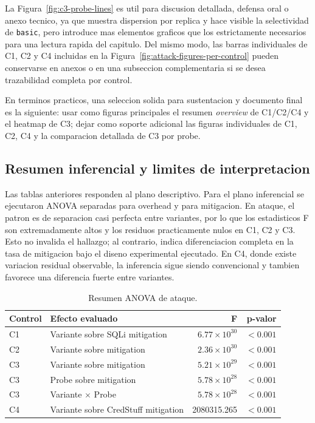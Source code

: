 La Figura~\ref{fig:c3-probe-lines} es util para discusion detallada, defensa oral o anexo tecnico, ya que muestra dispersion por replica y hace visible la selectividad de \texttt{basic}, pero introduce mas elementos graficos que los estrictamente necesarios para una lectura rapida del capitulo. Del mismo modo, las barras individuales de C1, C2 y C4 incluidas en la Figura~\ref{fig:attack-figures-per-control} pueden conservarse en anexos o en una subseccion complementaria si se desea trazabilidad completa por control.

En terminos practicos, una seleccion solida para sustentacion y documento final es la siguiente: usar como figuras principales el resumen \textit{overview} de C1/C2/C4 y el heatmap de C3; dejar como soporte adicional las figuras individuales de C1, C2, C4 y la comparacion detallada de C3 por probe.

\subsection{Resumen inferencial y limites de interpretacion}

Las tablas anteriores responden al plano descriptivo. Para el plano inferencial se ejecutaron ANOVA separadas para overhead y para mitigacion. En ataque, el patron es de separacion casi perfecta entre variantes, por lo que los estadisticos F son extremadamente altos y los residuos practicamente nulos en C1, C2 y C3. Esto no invalida el hallazgo; al contrario, indica diferenciacion completa en la tasa de mitigacion bajo el diseno experimental ejecutado. En C4, donde existe variacion residual observable, la inferencia sigue siendo convencional y tambien favorece una diferencia fuerte entre variantes.

\begin{table}[htbp]
\centering
\small
\caption{Resumen ANOVA de ataque.}
\label{tab:attack-anova-summary}
\begin{tabular}{llrr}
\toprule
Control & Efecto evaluado & F & p-valor \\
\midrule
C1 & Variante sobre SQLi mitigation & $6.77 \times 10^{30}$ & $< 0.001$ \\
C2 & Variante sobre mitigation & $2.36 \times 10^{30}$ & $< 0.001$ \\
C3 & Variante sobre mitigation & $5.21 \times 10^{29}$ & $< 0.001$ \\
C3 & Probe sobre mitigation & $5.78 \times 10^{28}$ & $< 0.001$ \\
C3 & Variante $\times$ Probe & $5.78 \times 10^{28}$ & $< 0.001$ \\
C4 & Variante sobre CredStuff mitigation & 2080315.265 & $< 0.001$ \\
\bottomrule
\end{tabular}
\end{table}

